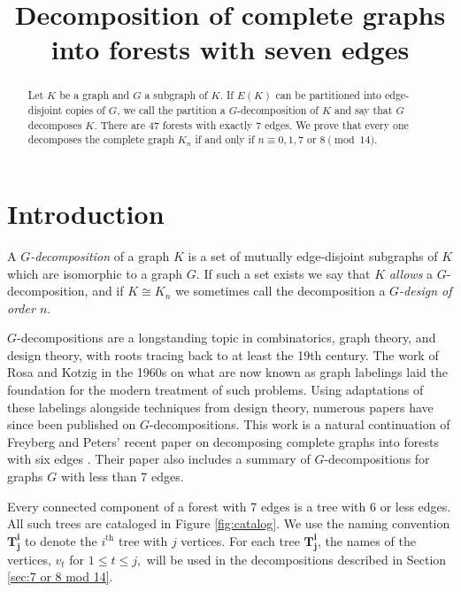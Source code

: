 \documentclass{dmgt}
\title{Decomposition of complete graphs into forests with seven edges}
\begin{document}
\begin{abstract}
 Let $K$ be a graph and $G$ a subgraph of $K$. If $E(K)$ can be partitioned into edge-disjoint copies of $G$, we call the partition a $G$-decomposition of $K$ and say that $G$ decomposes $K.$ There are 47 forests with exactly 7 edges. We prove that every one decomposes the complete graph $K_{n}$ if and only if $n \equiv 0,1,7 \textrm{ or }8\pmod{14}.$

 
\end{abstract}
\section{Introduction}
A \textit{$G$-decomposition} of a graph $K$ is a set of mutually edge-disjoint subgraphs of $K$ which are isomorphic to a graph $G$. If such a set exists we say that $K$ \textit{allows} a $G$-decomposition, and if $K\cong K_{n}$ we sometimes call the decomposition a \textit{$G$-design of order $n$}.

$G$-decompositions are a longstanding topic in combinatorics, graph theory, and design theory, with roots tracing back to at least the 19th century. The work of Rosa and Kotzig in the 1960s on what are now known as graph labelings laid the foundation for the modern treatment of such problems. Using adaptations of these labelings alongside techniques from design theory, numerous papers have since been published on $G$-decompositions. This work is a natural continuation of Freyberg and Peters' recent paper on decomposing complete graphs into forests with six edges \cite{bib:Peters}. Their paper also includes a summary of $G$-decompositions for graphs $G$ with less than 7 edges.

Every connected component of a forest with 7 edges is a tree with 6 or less edges. All such trees are cataloged in Figure \ref{fig:catalog}. We use the naming convention $\mathbf{T_{j}^i}$ to denote the $i^{\textrm{th}}$ tree with $j$ vertices. For each tree $\mathbf{T_{j}^i}$, the names of the vertices, $v_t$ for $1 \leq t \leq j,$ will be used in the decompositions described in Section \ref{sec:7 or 8 mod 14}.
\end{document}
